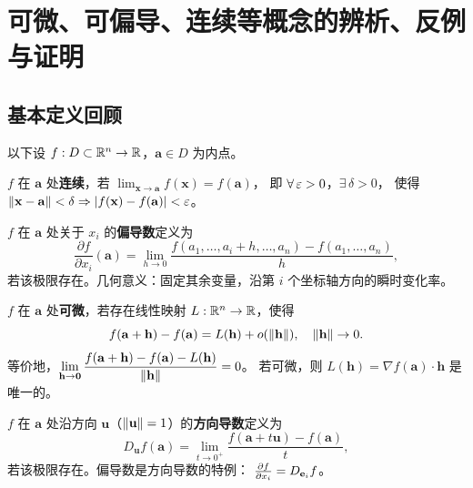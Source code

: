 \documentclass{ctexart}
\begin{document}
\section{可微、可偏导、连续等概念的辨析、反例与证明}

\subsection{基本定义回顾}

以下设 $f: D \subset \mathbb{R}^n \to \mathbb{R}$，$\mathbf{a} \in D$ 为内点。

\begin{definition}[连续]
  $f$ 在 $\mathbf{a}$ 处\textbf{连续}，若
  $\lim_{\mathbf{x} \to \mathbf{a}} f(\mathbf{x}) = f(\mathbf{a})$，
  即 $\forall\, \varepsilon > 0$，$\exists\, \delta > 0$，
  使得 $\left\| \mathbf{x} - \mathbf{a} \right\| < \delta \Rightarrow \left| f(\mathbf{x}) - f(\mathbf{a}) \right| < \varepsilon$。
\end{definition}

\begin{definition}[偏导数]
  $f$ 在 $\mathbf{a}$ 处关于 $x_i$ 的\textbf{偏导数}定义为
  \[
    \frac{\partial f}{\partial x_i}(\mathbf{a})
    = \lim_{h \to 0} \frac{f(a_1, \ldots, a_i + h, \ldots, a_n) - f(a_1, \ldots, a_n)}{h},
  \]
  若该极限存在。几何意义：固定其余变量，沿第 $i$ 个坐标轴方向的瞬时变化率。
\end{definition}

\begin{definition}[可微]
  $f$ 在 $\mathbf{a}$ 处\textbf{可微}，若存在线性映射 $L: \mathbb{R}^n \to \mathbb{R}$，使得
  \[
    f(\mathbf{a} + \mathbf{h}) - f(\mathbf{a}) = L(\mathbf{h}) + o(\left\| \mathbf{h} \right\|), \quad \left\| \mathbf{h} \right\| \to 0.
  \]
  等价地，$\displaystyle\lim_{\mathbf{h} \to \mathbf{0}}
  \frac{f(\mathbf{a}+\mathbf{h}) - f(\mathbf{a}) - L(\mathbf{h})}{\left\| \mathbf{h} \right\|} = 0$。
  若可微，则 $L(\mathbf{h}) = \nabla f(\mathbf{a}) \cdot \mathbf{h}$ 是唯一的。
\end{definition}

\begin{definition}[方向导数]
  $f$ 在 $\mathbf{a}$ 处沿方向 $\mathbf{u}$（$\left\| \mathbf{u} \right\| = 1$）的\textbf{方向导数}定义为
  \[
    D_{\mathbf{u}} f(\mathbf{a})
    = \lim_{t \to 0^+} \frac{f(\mathbf{a} + t\mathbf{u}) - f(\mathbf{a})}{t},
  \]
  若该极限存在。偏导数是方向导数的特例：
  $\frac{\partial f}{\partial x_i} = D_{\mathbf{e}_i} f$。
\end{definition}
\end{document}

